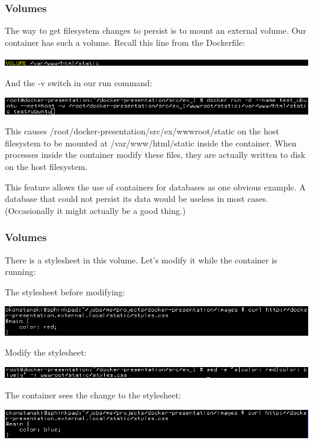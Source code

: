\documentclass[helvetica,english,utf8,notitle,nologo]{beamer}
\begin{document}
\begin{frame}
  \frametitle{Volumes}

  The way to get filesystem changes to persist is to mount an external
  volume. Our container has such a volume. Recall this line from the
  Dockerfile:

  \includegraphics[scale=0.44]{image_17}

  And the -v switch in our run command:

  \includegraphics[scale=0.44]{image_18}

  This causes
  /root/docker-presentation/src/ex/wwwroot/static on
  the host filesystem to be mounted at /var/www/html/static inside the
  container. When processes inside the container modify these files,
  they are actually written to disk on the host filesystem.

  This feature allows the use of containers for databases as one
  obvious example. A database that could not persist its data would be
  useless in most cases. (Occasionally it might actually be a good
  thing.)
\end{frame}

\begin{frame}
  \frametitle{Volumes}

  There is a stylesheet in this volume. Let's modify it while the
  container is running:

  The stylesheet before modifying:

  \includegraphics[scale=0.44]{image_19}

  Modify the stylesheet:

  \includegraphics[scale=0.44]{image_20}

  The container sees the change to the stylesheet:

  \includegraphics[scale=0.44]{image_21}
\end{frame}
\end{document}
